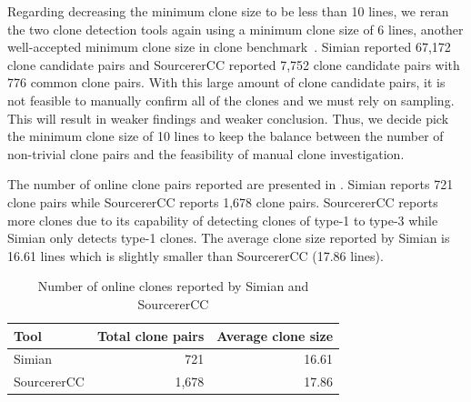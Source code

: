 \documentclass[10pt,journal,compsoc]{IEEEtran}
\begin{document}
Regarding decreasing the minimum clone size to be less than 10 lines, we reran
the two clone detection tools again using a minimum
clone size of 6 lines, another well-accepted minimum clone size in clone
benchmark~\cite{Bellon2007}. Simian reported 67,172 clone candidate pairs and
SourcererCC reported 7,752 clone candidate pairs with 776 common clone pairs. 
With this large amount of clone
candidate pairs, it is not feasible to manually confirm all of the clones and we
must rely on sampling. This will result in weaker findings and
weaker conclusion. Thus, we decide pick the minimum clone size of 10 lines
to keep the balance between the number of non-trivial clone pairs and the
feasibility of manual clone investigation.


The number of online clone pairs reported %
are presented in . Simian reports 721 clone
pairs while SourcererCC reports 1,678 clone pairs. 
SourcererCC reports more clones due to its capability of detecting
clones of type-1 to type-3 while Simian only detects type-1 clones.
The average clone size reported by Simian is
16.61 lines which is slightly smaller than SourcererCC (17.86 lines).

\begin{table}
	\centering
	\caption{Number of online clones reported by Simian and SourcererCC}
	\label{tab:orig_stats}
	\begin{tabular}{lrr}
		\toprule
		Tool & \multicolumn{1}{c}{Total clone pairs} & \multicolumn{1}{c}{Average clone size} \\
		\midrule
		Simian & 721 & 16.61 \\
		SourcererCC & 1,678 & 17.86 \\
		\bottomrule
	\end{tabular} %
\end{table}
\end{document}
